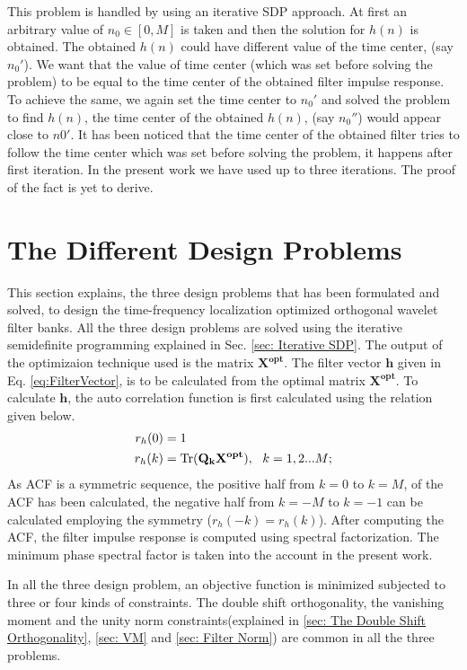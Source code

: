 This problem is handled by using an iterative SDP approach. At first an arbitrary value of $ n_0 \in [0,M]$ is taken and then the solution for $h(n)$ is obtained. The  obtained $h(n)$ could have different value of the time center, (say $n_0'$). We want that the value of time center (which was set before solving the problem) to be equal to the time center of the obtained filter impulse response. To achieve the same, we again set the time center to $n_0'$ and solved the problem to find $h(n)$, the time center of the obtained $h(n)$, (say $n_0''$) would appear close to $n0'$. It has been noticed that the time center of the obtained filter tries to follow the time center which was set before solving the problem, it happens after first iteration. In the present work we have used up to three iterations. The proof of the fact is yet to derive.

\section{The Different Design Problems}
\label{sec: The Different Design Problems}
This section explains, the three design problems that has been formulated and solved, to design the time-frequency localization optimized orthogonal wavelet filter banks. All the three design problems are solved using the iterative semidefinite programming explained in Sec. \ref{sec: Iterative SDP}. The output of the optimizaion technique used is the matrix $\mathbf{X^{opt}}$. The filter vector $\mathbf{h}$ given in Eq. \ref{eq:FilterVector}, is to be calculated from the optimal matrix $\mathbf{X^{opt}}$. To calculate $\mathbf{h}$, the auto correlation function is first calculated using the relation given below.  
\begin{eqnarray}
\label{eq: ACF from Xopt}
\begin{aligned}
	r_h(0) &= 1\\
	r_h(k) &= \operatorname{Tr}(\mathbf{Q_k{X^{opt}}}),\,\,\,\,k=1,2...M;
\end{aligned}
\end{eqnarray}
As ACF is a symmetric sequence, the positive half from $k=0$ to $k=M$, of the ACF has been calculated, the negative half from $k=-M$ to $k=-1$ can be calculated employing the symmetry ($r_h(-k) = r_h(k)$). After computing the ACF, the filter impulse response is computed using spectral factorization. The minimum phase spectral factor is taken into the account in the present work.

In all the three design problem, an objective function is minimized subjected to three or four kinds of constraints. The double shift orthogonality, the vanishing moment and the unity norm constraints(explained in \ref{sec: The Double Shift Orthogonality}, \ref{sec: VM} and \ref{sec: Filter Norm}) are common in all the three problems. 
